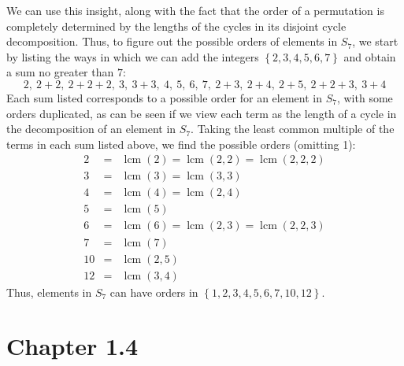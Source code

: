 \documentclass[10pt]{article}
\newcommand{\lcm}{\operatorname{lcm}}
\begin{document}
\begin{itemize}
We can use this insight, along with the fact that the order of a
permutation is completely determined by the lengths of the cycles in its
disjoint cycle decomposition. Thus, to figure out the possible orders of
elements in $S_7$, we start by listing the ways in which we can add the
integers $\left\{2,3,4,5,6,7\right\}$ and obtain a sum no greater than
$7$:
$$
    2,\ 2+2,\ 2+2+2,\ 3,\ 3+3,\ 4,\ 5,\ 6,\ 7,\ 2+3,\ 2+4,\ 2+5,\
    2+2+3,\ 3+4
$$
Each sum listed corresponds to a possible order for an element in $S_7$,
with some orders duplicated, as can be seen if we view each term as the
length of a cycle in the decomposition of an element in $S_7$. Taking
the least common multiple of the terms in each sum listed above, we find
the possible orders (omitting 1):
\begin{eqnarray*}
    2 & = & \lcm(2) = \lcm(2,2) = \lcm(2,2,2) \\
    3 & = & \lcm(3) = \lcm(3,3) \\
    4 & = & \lcm(4) = \lcm(2,4) \\
    5 & = & \lcm(5) \\
    6 & = & \lcm(6) = \lcm(2,3) = \lcm(2,2,3) \\
    7 & = & \lcm(7) \\
    10 & = & \lcm(2,5) \\
    12 & = & \lcm(3,4)
\end{eqnarray*}
Thus, elements in $S_7$ can have orders in
$\left\{1,2,3,4,5,6,7,10,12\right\}$.
\end{itemize}




\section*{Chapter 1.4}
\end{document}
